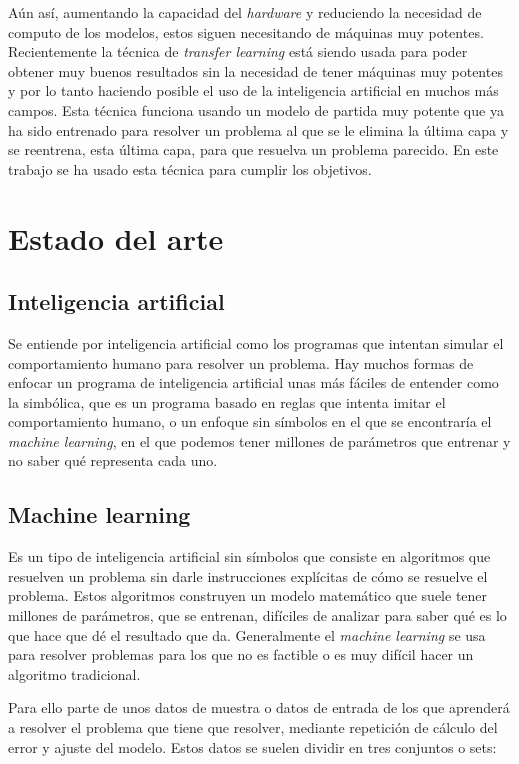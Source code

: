 \documentclass[12pt,a4paper]{article}
\begin{document}
Aún así, aumentando la capacidad del \textit{hardware} y reduciendo la necesidad de computo de los modelos, estos siguen necesitando de máquinas muy potentes. Recientemente la técnica de \textit{transfer learning} está siendo usada para poder obtener muy buenos resultados sin la necesidad de tener máquinas muy potentes y por lo tanto haciendo posible el uso de la inteligencia artificial en muchos más campos. Esta técnica funciona usando un modelo de partida muy potente que ya ha sido entrenado para resolver un problema al que se le elimina la última capa y se reentrena, esta última capa, para que resuelva un problema parecido. En este trabajo se ha usado esta técnica para cumplir los objetivos.

\newpage
\section{Estado del arte}

\subsection{Inteligencia artificial}
Se entiende por inteligencia artificial como los programas que intentan simular el comportamiento humano para resolver un problema. Hay muchos formas de enfocar un programa de inteligencia artificial unas más fáciles de entender como la simbólica, que es un programa basado en reglas que intenta imitar el comportamiento humano, o un enfoque sin símbolos en el que se encontraría el \textit{machine learning}, en el que podemos tener millones de parámetros que entrenar y no saber qué representa cada uno.

\subsection{Machine learning}
Es un tipo de inteligencia artificial sin símbolos que consiste en algoritmos que resuelven un problema sin darle instrucciones explícitas de cómo se resuelve el problema. Estos algoritmos construyen un modelo matemático que suele tener millones de parámetros, que se entrenan, difíciles de analizar para saber qué es lo que hace que dé el resultado que da. Generalmente el \textit{machine learning} se usa para resolver problemas para los que no es factible o es muy difícil hacer un algoritmo tradicional.
\bigskip

Para ello parte de unos datos de muestra o datos de entrada de los que aprenderá a resolver el problema que tiene que resolver, mediante repetición de cálculo del error y ajuste del modelo. Estos datos se suelen dividir en tres conjuntos o sets:
\end{document}
